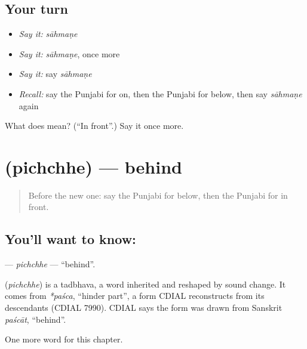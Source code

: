 \subsection*{Your turn}
\begin{itemize}
\raggedright
  \item \emph{Say it:} \emph{sāhmaṇe}
  \item \emph{Say it:} \emph{sāhmaṇe}, once more
  \item \emph{Say it:} say \emph{sāhmaṇe}
  \item \emph{Recall:} say the Punjabi for on, then the Punjabi for below, then say \emph{sāhmaṇe} again
\end{itemize}

\begin{tcolorbox}[breakable,colback=teal!4,colframe=teal!35!black,title={Before you move on}]
What does  mean? (\textquotedblleft{}In front\textquotedblright{}.) Say it once more.
\end{tcolorbox}
\section[\texorpdfstring{\pa{ਪਿੱਛੇ} (pichchhe)}{ਪਿੱਛੇ (pichchhe)}]{ (pichchhe) — behind}

\label{lesson:PA-C89-pichchhe}



\begin{quote}
Before the new one: say the Punjabi for below, then the Punjabi for in front.
\end{quote}

\subsection*{You'll want to know: }
\textbf{} — \emph{pichchhe} — \textquotedblleft{}behind\textquotedblright{}.

\begin{cousinweb}
\textbf{} (\emph{pichchhe}) is a tadbhava, a word inherited and reshaped by sound change. It comes from \emph{*paśca}, \textquotedblleft{}hinder part\textquotedblright{}, a form CDIAL reconstructs from its descendants (CDIAL 7990). CDIAL says the form was drawn from Sanskrit \emph{paścāt}, \textquotedblleft{}behind\textquotedblright{}.
\end{cousinweb}

\begin{grammarlens}[title={What you've built}]
One more word for this chapter.
\end{grammarlens}


